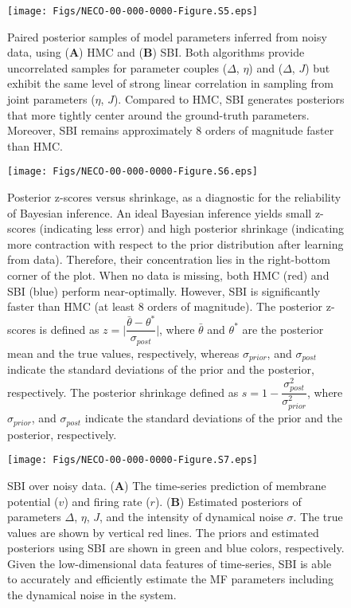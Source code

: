 \documentclass[12pt]{article}
\begin{document}
\begin{figure}
    \centering
    \texttt{[image: Figs/NECO-00-000-0000-Figure.S5.eps]}
    \renewcommand{\thefigure}{S\arabic{figure}}
    \caption{Paired posterior samples of model parameters inferred from noisy data, using (\textbf{A}) HMC and (\textbf{B}) SBI. Both algorithms provide uncorrelated samples for parameter couples ($\Delta$, $\eta$) and ($\Delta$, $J$) but exhibit the same level of strong linear correlation in sampling from joint parameters ($\eta$, $J$). Compared to HMC, SBI generates posteriors that more tightly center around the ground-truth parameters. Moreover, SBI remains approximately 8 orders of magnitude faster than HMC.}
    \label{fig:SDE_joint_posterior}
\end{figure}


\begin{figure}[ht]
    \centering
    \texttt{[image: Figs/NECO-00-000-0000-Figure.S6.eps]}
    \renewcommand{\thefigure}{S\arabic{figure}}
    \caption{Posterior z-scores versus shrinkage, as a diagnostic for the reliability of Bayesian inference. An ideal Bayesian inference yields small z-scores (indicating less error) and high posterior shrinkage (indicating more contraction with respect to the prior distribution after learning from data). Therefore, their concentration lies in the right-bottom corner of the plot. When no data is missing, both HMC (red) and SBI (blue) perform near-optimally. However, SBI is significantly faster than HMC (at least 8 orders of magnitude). The posterior z-scores is defined as $z = \mathopen | \dfrac{\bar \theta-\theta^\ast}{\sigma_{post}}\mathclose|$, where $\bar \theta$ and $\theta^\ast$ are the posterior mean and the true values, respectively, whereas $\sigma_{prior}$, and $\sigma_{post}$ indicate the standard deviations of the prior and the posterior, respectively. The posterior shrinkage defined as $s= 1- \dfrac{\sigma^2_{post}}{\sigma^2_{prior}}$, where $\sigma_{prior}$, and $\sigma_{post}$ indicate the standard deviations of the prior and the posterior, respectively. 
    } 
    \label{fig:Zscores_Shrinkage_SDE}
\end{figure}


\begin{figure}[ht]
    \centering
    \texttt{[image: Figs/NECO-00-000-0000-Figure.S7.eps]}
    \renewcommand{\thefigure}{S\arabic{figure}}
    \caption{SBI over noisy data.  (\textbf{A}) The time-series prediction of membrane potential ($v$) and firing rate ($r$). (\textbf{B}) Estimated posteriors of parameters $\Delta$, $\eta$, $J$, and the intensity of dynamical noise $\sigma$. The true values are shown by vertical red lines. The priors and estimated posteriors using SBI are shown in green and blue colors, respectively. Given the low-dimensional data features of time-series, SBI is able to accurately and efficiently estimate the MF parameters including the dynamical noise in the system. }
    \label{fig:SBI_SDE_Istep_RV_NoiseEstimation}
\end{figure}
\end{document}
